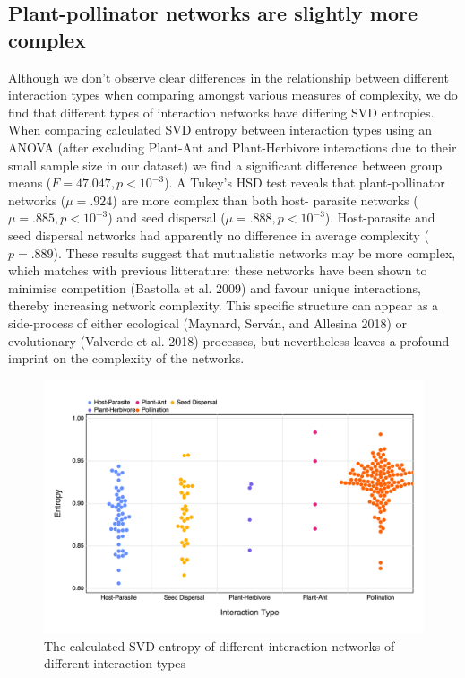 \documentclass[10pt,oneside]{article}
\makeatletter
\def\maxwidth{\ifdim\Gin@nat@width>\linewidth\linewidth
\else\Gin@nat@width\fi}
\let\Oldincludegraphics\includegraphics
\renewcommand{\includegraphics}[1]{\Oldincludegraphics[width=\maxwidth]{#1}}
\makeatother
\begin{document}
\hypertarget{plant-pollinator-networks-are-slightly-more-complex}{%
\subsection{Plant-pollinator networks are slightly more
complex}\label{plant-pollinator-networks-are-slightly-more-complex}}

Although we don't observe clear differences in the relationship between
different interaction types when comparing amongst various measures of
complexity, we do find that different types of interaction networks have
differing SVD entropies. When comparing calculated SVD entropy between
interaction types using an ANOVA (after excluding Plant-Ant and
Plant-Herbivore interactions due to their small sample size in our
dataset) we find a significant difference between group means
(\(F = 47.047, p < 10^{-3}\)). A Tukey's HSD test reveals that
plant-pollinator networks (\(\mu = .924\)) are more complex than both
host- parasite networks (\(\mu = .885, p < 10^{-3}\)) and seed dispersal
(\(\mu = .888, p < 10^{-3}\)). Host-parasite and seed dispersal networks
had apparently no difference in average complexity (\(p = .889\)). These
results suggest that mutualistic networks may be more complex, which
matches with previous litterature: these networks have been shown to
minimise competition (Bastolla et al. 2009) and favour unique
interactions, thereby increasing network complexity. This specific
structure can appear as a side-process of either ecological (Maynard,
Serván, and Allesina 2018) or evolutionary (Valverde et al. 2018)
processes, but nevertheless leaves a profound imprint on the complexity
of the networks.

\begin{figure}
\hypertarget{fig:type}{%
\centering
\includegraphics{figures/interactiontype_v_entropy.png}
\caption{The calculated SVD entropy of different interaction networks of
different interaction types}\label{fig:type}
}
\end{figure}
\end{document}
